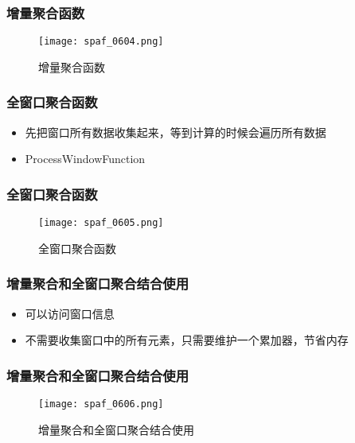 \documentclass{beamer}
\begin{document}
  \begin{frame}
      \frametitle{增量聚合函数}
  
      \begin{figure}
        \centering
        \texttt{[image: spaf\_0604.png]}
        \caption{增量聚合函数}
      \end{figure}
  
  \end{frame}

  \begin{frame}
      \frametitle{全窗口聚合函数}
  
      \begin{itemize}
          \item 先把窗口所有数据收集起来，等到计算的时候会遍历所有数据
          \item ProcessWindowFunction
      \end{itemize}
  
  \end{frame}

  \begin{frame}
      \frametitle{全窗口聚合函数}
  
      \begin{figure}
        \centering
        \texttt{[image: spaf\_0605.png]}
        \caption{全窗口聚合函数}
      \end{figure}
  
  \end{frame}

  \begin{frame}
      \frametitle{增量聚合和全窗口聚合结合使用}
  
      \begin{itemize}
          \item 可以访问窗口信息
          \item 不需要收集窗口中的所有元素，只需要维护一个累加器，节省内存
      \end{itemize}
  
  \end{frame}

  \begin{frame}
      \frametitle{增量聚合和全窗口聚合结合使用}
  
      \begin{figure}
        \centering
        \texttt{[image: spaf\_0606.png]}
        \caption{增量聚合和全窗口聚合结合使用}
      \end{figure}
  
  \end{frame}
\end{document}
